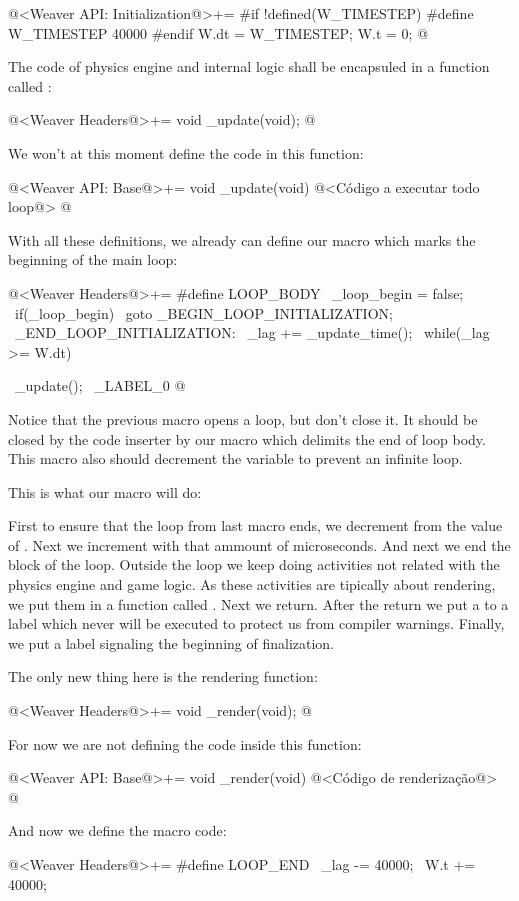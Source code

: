\iniciocodigo
@<Weaver API: Initialization@>+=
#if !defined(W_TIMESTEP)
#define W_TIMESTEP 40000
#endif
W.dt = W_TIMESTEP;
W.t = 0;
@
\fimcodigo

The code of physics engine and internal logic shall be encapsuled in a
function called :

\iniciocodigo
@<Weaver Headers@>+=
void _update(void);
@
\fimcodigo

We won't at this moment define the code in this function:

\iniciocodigo
@<Weaver API: Base@>+=
void _update(void){
  @<Código a executar todo loop@>
}
@
\fimcodigo

With all these definitions, we already can define our macro which
marks the beginning of the main loop:

\iniciocodigo
@<Weaver Headers@>+=
#define LOOP_BODY                                            \
  _loop_begin =  false;                                      \
  if(_loop_begin)                                            \
    goto _BEGIN_LOOP_INITIALIZATION;                         \
_END_LOOP_INITIALIZATION:                                    \
  _lag += _update_time();                                    \
  while(_lag >= W.dt){                                       \
    _update();                                               \
_LABEL_0
@
\fimcodigo

Notice that the previous macro opens a \monoespaco{while} loop, but
don't close it. It should be closed by the code inserter by our macro
which delimits the end of loop body. This macro also should decrement
the variable \monoespaco{\_lag} to prevent an infinite loop.


This is what our macro  will do:

First to ensure that the loop from last macro ends, we decrement from
\monoespaco{\_lag} the value of \monoespaco{W.dt}. Next we increment
\monoespaco{W.t} with that ammount of microseconds. And next we end
the block of the loop. Outside the loop we keep doing activities not
related with the physics engine and game logic. As these activities
are tipically about rendering, we put them in a function called 
\monoespaco{\_render}. Next we return. After the return we put a
 to a label which never will be executed to protect us
from compiler warnings. Finally, we put a label signaling the
beginning of finalization.

The only new thing here is the rendering function:

\iniciocodigo
@<Weaver Headers@>+=
void _render(void);
@
\fimcodigo

For now we are not defining the code inside this function:

\iniciocodigo
@<Weaver API: Base@>+=
void _render(void){
  @<Código de renderização@>
}
@
\fimcodigo

And now we define the macro code:

\iniciocodigo
@<Weaver Headers@>+=
#define LOOP_END                                           \
    _lag -=  40000;                                        \
    W.t +=  40000;                                         \
  }                                                        \
